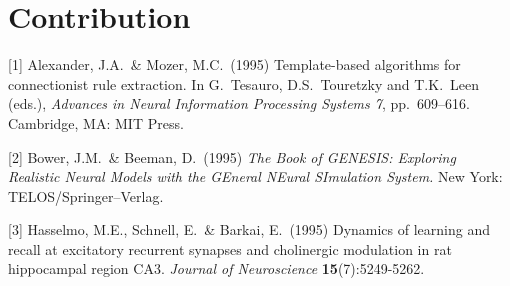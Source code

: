 \documentclass{article}
\begin{document}
\section{Contribution}

\small

[1] Alexander, J.A.\ \& Mozer, M.C.\ (1995) Template-based algorithms for
connectionist rule extraction. In G.\ Tesauro, D.S.\ Touretzky and T.K.\ Leen
(eds.), {\it Advances in Neural Information Processing Systems 7},
pp.\ 609--616. Cambridge, MA: MIT Press.

[2] Bower, J.M.\ \& Beeman, D.\ (1995) {\it The Book of GENESIS: Exploring
  Realistic Neural Models with the GEneral NEural SImulation System.}  New York:
TELOS/Springer--Verlag.

[3] Hasselmo, M.E., Schnell, E.\ \& Barkai, E.\ (1995) Dynamics of learning and
recall at excitatory recurrent synapses and cholinergic modulation in rat
hippocampal region CA3. {\it Journal of Neuroscience} {\bf 15}(7):5249-5262.
\end{document}
